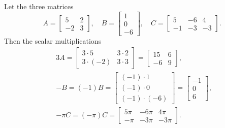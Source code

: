 \begin{example} \label{eg:}
Let the three matrices
\begin{equation*}
A=\begin{bmatrix} 5 & 2\\ -2 & 3 \end{bmatrix},\quad
B=\begin{bmatrix} 1\\ 0\\ -6 \end{bmatrix},\quad
C=\begin{bmatrix} 5 & -6 & 4\\ -1 & -3 & -3 \end{bmatrix}.
\end{equation*}
Then the scalar multiplications
\begin{eqnarray*}
&&3A=\begin{bmatrix} 3\cdot5 & 3\cdot2\\ 3\cdot(-2) & 3\cdot3 \end{bmatrix}
=\begin{bmatrix} 15 & 6\\ -6 & 9 \end{bmatrix},\quad
\\&&-B=(-1)B=\begin{bmatrix} (-1)\cdot1\\ (-1)\cdot0\\ (-1)\cdot(-6) \end{bmatrix}
=\begin{bmatrix} -1\\ 0\\ 6 \end{bmatrix},\quad
\\&&-\pi C=(-\pi)C=\begin{bmatrix} 5\pi & -6\pi & 4\pi\\ -\pi & -3\pi & -3\pi \end{bmatrix}.
\end{eqnarray*}
\end{example}


